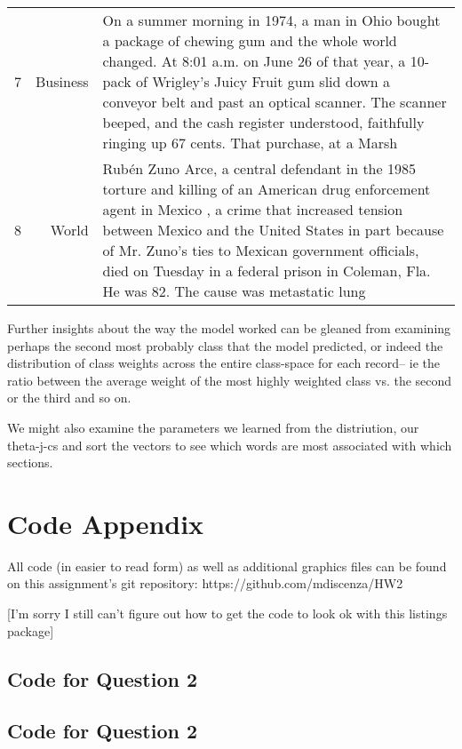 \documentclass{article}
\begin{document}
\begin{table}[H]
\begin{tabular}{lrp{3in}}
  7 & Business & On a summer morning in 1974, a man in Ohio bought a package of chewing gum and the whole world changed. At 8:01 a.m. on June 26 of that year, a 10-pack of Wrigley's Juicy Fruit gum slid down a conveyor belt and past an optical scanner. The scanner beeped, and the cash register understood, faithfully ringing up 67 cents. That purchase, at a Marsh \\ 
  8 & World & Rubén Zuno Arce, a central defendant in the 1985 torture and killing of an American drug enforcement agent in Mexico , a crime that increased tension between Mexico and the United States in part because of Mr. Zuno's ties to Mexican government officials, died on Tuesday in a federal prison in Coleman, Fla. He was 82. The cause was metastatic lung \\ 
   \hline
\end{tabular}
\end{table}


Further insights about the way the model worked can be gleaned from examining perhaps the second most probably class that the model predicted, or indeed the distribution of class weights across the entire class-space for each record-- ie the ratio between the average weight of the most highly weighted class vs. the second or the third and so on.

We might also examine the parameters we learned from the distriution, our theta-j-cs and sort the vectors to see which words are most associated with which sections.



\section{Code Appendix}
All code (in easier to read form) as well as additional graphics files can be found on this assignment's git repository:
https://github.com/mdiscenza/HW2


[I'm sorry I still can't figure out how to get the code to look ok with this listings package]

\subsection{Code for Question 2}




\subsection{Code for Question 2}


\end{document}
